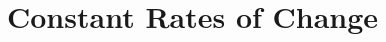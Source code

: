 \documentclass[12pt]{report}
\newtheorem{definition}{Definition}[subsection]
\begin{document}
\newcommand{\epzero}{\forall\epsilon\textgreater0}
\newcommand{\epone}{\textless\epsilon}
\newcommand{\la}{\left|}
\newcommand{\ra}{\right|}
\newcommand{\lno}{\left\|}
\newcommand{\rno}{\right\|}
\newcommand{\xinf}{x\rightarrow\infty}
\newcommand{\less}{\textless}
\newcommand{\greater}{\textgreater}
\newcommand{\bff}{\begin{definition}}
\newcommand{\eff}{\end{definition}}
\newcommand{\reals}{\mathbb{R}}
\newcommand{\exN}{\exists N\in\mathbb{N}}
\newcommand{\tvect}[3]{%
\newcommand{\grad}{\nabla}
\newcommand{\weakarrow}{\hookrightarrow}
  \ensuremath{\Bigl(\negthinspace\begin{smallmatrix}#1\\#2\\#3\end{smallmatrix}\Bigr)}}
  \newcommand{\lnorm}{\left\|}
\newcommand{\rnorm}{\right\|}
\newcommand{\integers}{\mathbb{Z}}
\newcommand{\rationals}{\mathbb{Q}}
\newcommand{\Q}{\mathbb{Q}}
\newcommand{\F}{\mathbb{F}}
\newcommand{\jq}{\emph{Jerry}:}
\newcommand{\cq}{\emph{Christina}:}
\newcommand{\iq}{\emph{Interviewer}:}
\newcommand{\Lq}{\emph{Laura}:}
\newcommand{\N}{{\Bbb N}}
\newcommand{\Z}{{\Bbb Z}}
\newcommand{\dsp}{\displaystyle}
\newcommand{\blank}{\makebox[.5in]{\hrulefill}}
\newcommand{\be}{\begin{enumerate}}
\newcommand{\ee}{\end{enumerate}}
\newcommand{\limx}[1]{\lim_{x\rightarrow#1}}
\newcommand{\s}{\hskip6pt}

\section*{Constant Rates of Change}
\end{document}
